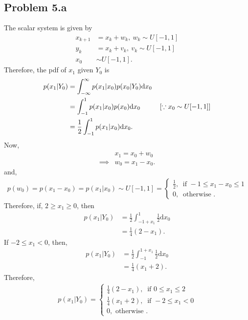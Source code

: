 \subsection*{Problem 5.a}
The scalar system is given by
\begin{align*}
	x_{k+1} &= x_k + w_k,\ w_k \sim U[-1,1]\\
	y_k &= x_k + v_k,\ v_k \sim U[-1,1]\\
	x_0 &\sim U[-1,1].
\end{align*}
Therefore, the pdf of $x_1$ given $Y_0$ is 
\begin{align*}
	p(x_1|Y_0) &= \int_{-\infty}^{\infty}p(x_1|x_0)p(x_0|Y_0)\text{d}x_0\\
	&= \int_{-1}^{1}p(x_1|x_0)p(x_0)\text{d}x_0\hspace*{1cm}[\because x_0 \sim U[-1,1]]\\
	&= \frac{1}{2}\int_{-1}^{1}p(x_1|x_0)\text{d}x_0.
\end{align*}
Now,
\begin{align*}
	& x_1 = x_0+w_0\\
	\implies & w_0 = x_1-x_0.
\end{align*}
and,
\begin{align*}
	p(w_0) = p(x_1-x_0) = p(x_1|x_0) \sim U[-1,1] = \begin{cases}
		\frac{1}{2},\ \text{ if } -1 \leq x_1-x_0 \leq 1\\
		0,\ \text{ otherwise }.
	\end{cases}
\end{align*}
Therefore, if, $2 \geq x_1 \geq 0$, then
\begin{align*}
	p(x_1|Y_0) &= \frac{1}{2}\int_{-1+x_1}^{1}\frac{1}{2}\text{d}x_0\\
	&= \frac{1}{4}(2-x_1).
\end{align*}
If $-2 \leq x_1 <0$, then,
\begin{align*}
	p(x_1|Y_0) &= \frac{1}{2}\int_{-1}^{1+x_1}\frac{1}{2}\text{d}x_0\\
	&= \frac{1}{4}(x_1+2).
\end{align*}
Therefore,
\begin{align}\label{eq:q5_1}
	p(x_1|Y_0) = \begin{cases}
		\frac{1}{4}(2-x_1),\ \text{ if }0 \leq x_1 \leq 2\\
		\frac{1}{4}(x_1+2),\ \text{ if }-2 \leq x_1 < 0\\
		0, \text{ otherwise }.
	\end{cases}
\end{align}
